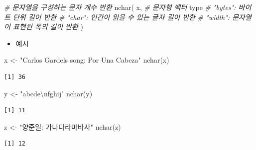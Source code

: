 \documentclass[
  11pt,
]{krantz}
\newenvironment{Shaded}{\begin{snugshade}}{\end{snugshade}}
\newcommand{\CommentTok}[1]{\textcolor[rgb]{0.37,0.37,0.37}{\textit{#1}}}
\newcommand{\FunctionTok}[1]{\textcolor[rgb]{0,0,0}{#1}}
\newcommand{\NormalTok}[1]{#1}
\newcommand{\OtherTok}[1]{\textcolor[rgb]{0.37,0.37,0.37}{#1}}
\newcommand{\SpecialCharTok}[1]{\textcolor[rgb]{0,0,0}{#1}}
\newcommand{\StringTok}[1]{\textcolor[rgb]{0.5,0.5,0.5}{#1}}
\providecommand{\tightlist}{%
  \setlength{\itemsep}{0pt}\setlength{\parskip}{0pt}}
\begin{document}
\footnotesize

\begin{Shaded}
\begin{Highlighting}[]
\CommentTok{\# 문자열을 구성하는 문자 개수 반환}
\FunctionTok{nchar}\NormalTok{(}
\NormalTok{  x, }\CommentTok{\# 문자형 벡터}
\NormalTok{  type }\CommentTok{\# "bytes": 바이트 단위 길이 반환}
       \CommentTok{\# "char": 인간이 읽을 수 있는 글자 길이 반환}
       \CommentTok{\# "width": 문자열이 표현된 폭의 길이 반환}
\NormalTok{)}
\end{Highlighting}
\end{Shaded}

\normalsize

\begin{itemize}
\tightlist
\item
  예시
\end{itemize}

\footnotesize

\begin{Shaded}
\begin{Highlighting}[]
\NormalTok{x }\OtherTok{\textless{}{-}} \StringTok{"Carlos Gardel\textquotesingle{}s song: Por Una Cabeza"}
\FunctionTok{nchar}\NormalTok{(x)}
\end{Highlighting}
\end{Shaded}

\begin{verbatim}
[1] 36
\end{verbatim}

\begin{Shaded}
\begin{Highlighting}[]
\NormalTok{y }\OtherTok{\textless{}{-}} \StringTok{"abcde}\SpecialCharTok{\textbackslash{}n}\StringTok{fghij"}
\FunctionTok{nchar}\NormalTok{(y)}
\end{Highlighting}
\end{Shaded}

\begin{verbatim}
[1] 11
\end{verbatim}

\begin{Shaded}
\begin{Highlighting}[]
\NormalTok{z }\OtherTok{\textless{}{-}} \StringTok{"양준일: 가나다라마바사"}
\FunctionTok{nchar}\NormalTok{(z)}
\end{Highlighting}
\end{Shaded}

\begin{verbatim}
[1] 12
\end{verbatim}
\end{document}
